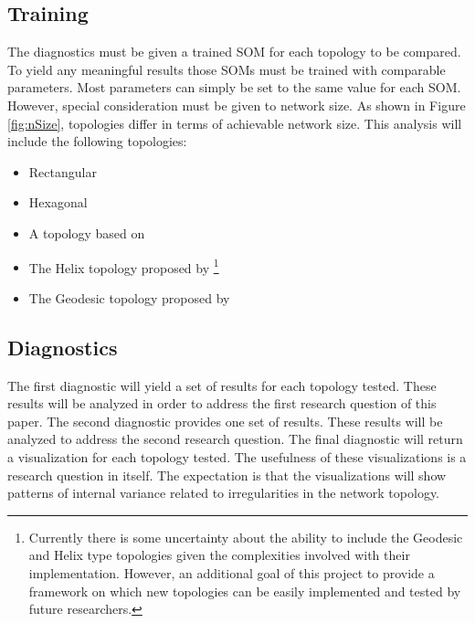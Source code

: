\subsection{Training}
The diagnostics must be given a trained SOM for each topology to be compared. To
yield any meaningful results those SOMs must be trained with comparable
parameters. Most parameters can simply be set to the same value for each SOM.
However, special consideration must be given to network size.  As shown in
Figure \ref{fig:nSize}, topologies differ in terms of achievable network size.
This analysis will include the following topologies:
\begin{itemize}
\item Rectangular
\item Hexagonal
\item A topology based on \cite{Rakhmanov94}
\item The Helix topology proposed by \cite{Nishio:2006fk}\footnote{Currently
there is some uncertainty about the ability to include the Geodesic and Helix
type topologies given the complexities involved with their implementation.
However, an additional goal of this project to provide a framework on which new
topologies can be easily implemented and tested by future researchers.}
\item The Geodesic topology proposed by \cite{wu2006}\footnotemark[2]
\end{itemize}

\subsection{Diagnostics}
The first diagnostic will yield a set of results for each topology tested.  These
results will be analyzed in order to address the first research question of this
paper.  The second diagnostic provides one set of results.  These results will
be analyzed to address the second research question.  The final diagnostic will
return a visualization for each topology tested.  The usefulness of these
visualizations is a research question in itself.  The expectation is that the
visualizations will show patterns of internal variance related to irregularities
in the network topology.

